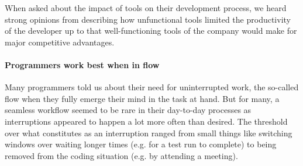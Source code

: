 When asked about the impact of tools on their development process, we heard strong opinions from describing how unfunctional tools limited the productivity of the developer up to that well-functioning tools of the company would make for major competitive advantages.

\paragraph{Programmers work best when in flow} Many programmers told us about their need for uninterrupted work, the so-called flow when they fully emerge their mind in the task at hand. But for many, a seamless workflow seemed to be rare in their day-to-day processes as interruptions appeared to happen a lot more often than desired. The threshold over what constitutes as an interruption ranged from small things like switching windows over waiting longer times (e.g. for a test run to complete) to being removed from the coding situation (e.g. by attending a meeting).
